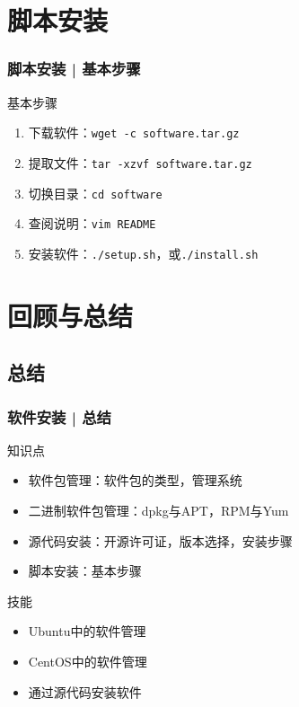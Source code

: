 \section{脚本安装}
\begin{frame}[fragile]
  \frametitle{脚本安装 | \alert{基本步骤}}
  \begin{block}{基本步骤}
    \begin{enumerate}
      \item 下载软件：\verb|wget -c software.tar.gz|
      \item 提取文件：\verb|tar -xzvf software.tar.gz|
      \item 切换目录：\verb|cd software|
      \item 查阅说明：\verb|vim README|
      \item 安装软件：\verb|./setup.sh|，或\verb|./install.sh|
    \end{enumerate}
  \end{block}
\end{frame}

\section{回顾与总结}
\subsection{总结}
\begin{frame}
  \frametitle{软件安装 | 总结}
  \begin{block}{知识点}
    \begin{itemize}
      \item 软件包管理：软件包的类型，管理系统
      \item 二进制软件包管理：dpkg与APT，RPM与Yum
      \item 源代码安装：开源许可证，版本选择，安装步骤
      \item 脚本安装：基本步骤
    \end{itemize}
  \end{block}
  \begin{block}{技能}
    \begin{itemize}
      \item Ubuntu中的软件管理
      \item CentOS中的软件管理
      \item 通过源代码安装软件
    \end{itemize}
  \end{block}
\end{frame}


